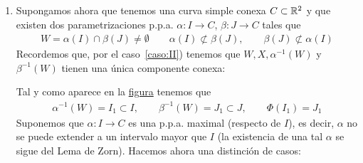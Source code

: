 \begin{observacion}
\begin{enumerate}
        Concluimos que $C$ ha de ser una curva de Jordan del tipo que estudiamos en el apartado~\ref{ej:periodica} del Ejemplo~\ref{ej:construccion}.

        \item Supongamos ahora que tenemos una curva simple conexa $C\subset \mathbb{R}^2$ y que existen dos parametrizaciones p.p.a. $\alpha:I \to C$, $\beta: J \to C$ tales que 
        \begin{gather*}
            W =  \alpha(I)\cap\beta(J)\neq \emptyset \qquad \alpha(I)\not\subset \beta(J), \qquad \beta(J)\not\subset \alpha(I)
        \end{gather*}
        Recordemos que, por el caso~\ref{caso:II}) tenemos que $W,X,\alpha^{-1}(W)$ y $\beta^{-1}(W)$ tienen una única componente conexa:
        \begin{figure}[H]\label{fig:una_cc}
            \centering
            \begin{subfigure}[b]{0.30\textwidth}
                \centering
            \end{subfigure}%
        \end{figure}
        Tal y como aparece en la \hyperref[fig:una_cc]{figura} tenemos que 
        \begin{gather*}
            \alpha^{-1}(W) = I_1 \subset I,\qquad \beta^{-1}(W) = J_1 \subset J,\qquad \Phi(I_1)=J_1
        \end{gather*}
        Suponemos que $\alpha: I  \to C$ es una p.p.a. maximal (respecto de $I$), es decir, $\alpha$ no se puede extender a un intervalo mayor que $I$ (la existencia de una tal $\alpha$ se sigue del Lema de Zorn). Hacemos ahora una distinción de casos:


\end{enumerate}
\end{observacion}
